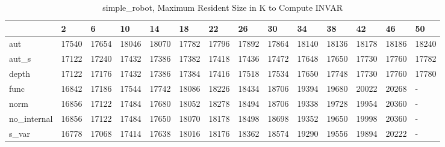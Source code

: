 \begin{table}
\caption{simple_robot, Maximum Resident Size in K to Compute INVAR}
\label{simple_robot_INVAR_size}
\begin{tabular}{llllllllllllll}
\toprule
 & 2 & 6 & 10 & 14 & 18 & 22 & 26 & 30 & 34 & 38 & 42 & 46 & 50 \\
\midrule
aut & 17540 & 17654 & 18046 & 18070 & 17782 & 17796 & 17892 & 17864 & 18140 & 18136 & 18178 & 18186 & 18240 \\
aut_s & 17122 & 17240 & 17432 & 17386 & 17382 & 17418 & 17436 & 17472 & 17648 & 17650 & 17730 & 17760 & 17782 \\
depth & 17122 & 17176 & 17432 & 17386 & 17384 & 17416 & 17518 & 17534 & 17650 & 17748 & 17730 & 17760 & 17780 \\
func & 16842 & 17186 & 17544 & 17742 & 18086 & 18226 & 18434 & 18706 & 19394 & 19680 & 20022 & 20268 & - \\
norm & 16856 & 17122 & 17484 & 17680 & 18052 & 18278 & 18494 & 18706 & 19338 & 19728 & 19954 & 20360 & - \\
no_internal & 16856 & 17122 & 17484 & 17650 & 18070 & 18178 & 18498 & 18698 & 19352 & 19650 & 19998 & 20360 & - \\
s_var & 16778 & 17068 & 17414 & 17638 & 18016 & 18176 & 18362 & 18574 & 19290 & 19556 & 19894 & 20222 & - \\
\bottomrule
\end{tabular}
\end{table}
